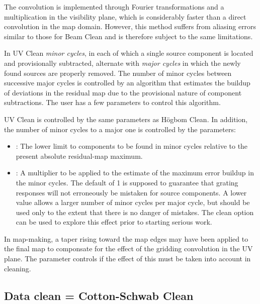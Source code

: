 	The convolution is implemented through Fourier transformations and a
multiplication in the visibility plane, which is considerably faster than a
direct convolution in the map domain.  However, this method suffers from
aliasing errors similar to those for Beam Clean and is therefore subject to the
same limitations.

	In UV Clean {\em minor cycles}, in each of which a single source
component is located and provisionally subtracted, alternate with {\em major
cycles} in which the newly found sources are properly removed. The number of
minor cycles between successive major cycles is controlled by an algorithm that
estimates the buildup of deviations in the residual map due to the provisional
nature of component subtractions.  The user has a few parameters to control
this algorithm.

	UV Clean is controlled by the same parameters as H\"ogbom Clean. In
addition, the number of minor cycles to a major one is controlled by the
parameters:

%
\begin{itemize}

\label{.cycle.depth}
\item   {}: The lower
limit to components to be found in minor cycles relative to the present
absolute residual-map maximum.

\label{.grating.factor}
\item {}: A
multiplier to be applied to the estimate of the maximum error buildup in the
minor cycles.  The default of 1 is supposed to guarantee that grating responses
will not erroneously be mistaken for source components.  A lower value allows a
larger number of minor cycles per major cycle, but should be used only to the
extent that there is no danger of mistakes. The 
clean option can be used to explore this effect prior to starting serious work.

\end{itemize}

	In map-making, a taper rising toward the map edges may have been
applied to the final map to componsate for the effect of the gridding
convolution in the UV plane.  The parameter
 controls if the
effect of this must be taken into account in cleaning.


\subsection{ Data clean = Cotton-Schwab Clean}
\label{.data.clean}


